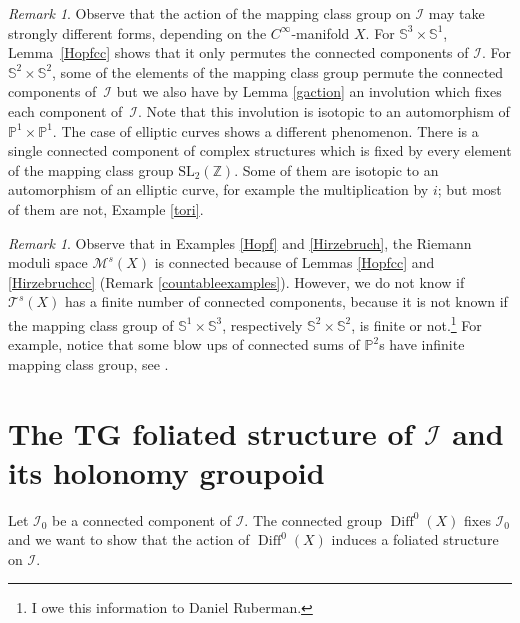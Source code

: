 \documentclass[JEP,XML,SOM,Unicode]{cedram}
\let\mathcal\mathscr
\newcommand{\SL}{\mathrm{SL}}
\DeclareMathOperator{\Diff}{Diff}
\theoremstyle{plain}
\theoremstyle{definition}
\theoremstyle{remark}
\newtheorem{remark}[theorem]{Remark}
\numberwithin{equation}{section}
\newcommand{\D}{\Diff^0(X)}
\newcommand{\cI}{\mathcal{I}}
\begin{document}
\begin{remark}
\label{ell}
Observe that the action of the mapping class group on $\cI$ may take strongly different forms, depending on the $C^\infty$-manifold $X$. For $\mathbb S^3\times\mathbb S^1$, Lemma~\ref{Hopfcc} shows that it only permutes the connected components of $\cI$. For $\mathbb S^2\times \mathbb S^2$, some of the elements of the mapping class group permute the connected components of~$\cI$ but we also have by Lemma \ref{gaction} an involution which fixes each component of~$\cI$. Note that this involution is isotopic to an automorphism of $\mathbb P^1\times\mathbb P^1$. The case of elliptic curves shows a different phenomenon. There is a single connected component of complex structures which is fixed by every element of the mapping class group $\SL_2(\mathbb Z)$. Some of them are isotopic to an automorphism of an elliptic curve, for example the multiplication by $i$; but most of them are not, \cf Example \ref{tori}.
\end{remark}

\begin{remark}
\label{CC2}
Observe that in Examples \ref{Hopf} and \ref{Hirzebruch}, the Riemann moduli space $\mathcal M^s(X)$ is connected because of Lemmas \ref{Hopfcc} and \ref{Hirzebruchcc} (\cf Remark \ref{countableexamples}). However, we do not know if $\mathcal T^s(X)$ has a finite number of connected components, because it is not known if the mapping class group of $\mathbb S^1\times\mathbb S^3$, respectively $\mathbb S^2\times\mathbb S^2$, is finite or not.\footnote{I owe this information to Daniel Ruberman.} For example, notice that some blow ups of connected sums of $\mathbb P^2$s have infinite mapping class group, see \cite{Ruber}.
\end{remark}

\section{The TG foliated structure of \texorpdfstring{$\cI$}{I} and its holonomy groupoid}
\label{TGfoliationsection}
Let $\cI_0$ be a connected component of $\cI$. The connected group $\D$ fixes $\cI_0$ and we want to show that the action of $\D$ induces a foliated structure on $\cI$.
\end{document}
